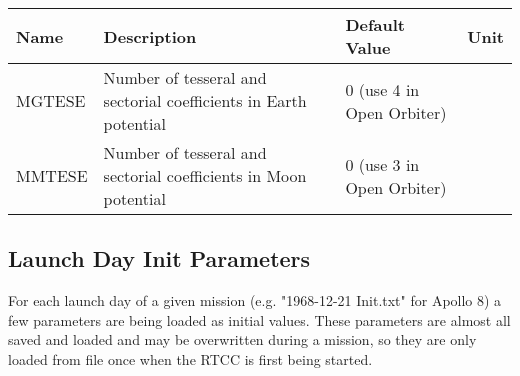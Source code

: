\documentclass[11pt]{article} %
\begin{document}
\newpage
\begin{tabular}{L{3cm} L{7cm} L{2.5cm} L{1.5cm}}
\hline
\textbf{Name} & \textbf{Description} & \textbf{Default Value} & \textbf{Unit}\\
\hline
MGTESE&Number of tesseral and sectorial coefficients in Earth potential&0 (use 4 in Open Orbiter)&\\
\hline
MMTESE&Number of tesseral and sectorial coefficients in Moon potential&0 (use 3 in Open Orbiter)&\\
\hline
\end{tabular}
\newpage
\subsection{Launch Day Init Parameters}

For each launch day of a given mission (e.g. "1968-12-21 Init.txt" for Apollo 8) a few parameters are being loaded as initial values. These parameters are almost all saved and loaded and may be overwritten during a mission, so they are only loaded from file once when the RTCC is first being started.\\
\end{document}
